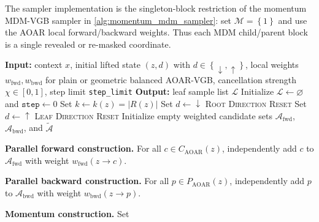 \documentclass{article}
\numberwithin{theorem}{section}
\numberwithin{proposition}{section}
\numberwithin{corollary}{section}
\numberwithin{lemma}{section}
\numberwithin{conjecture}{section}
\numberwithin{remark}{section}
\numberwithin{definition}{section}
\numberwithin{assumption}{section}
\numberwithin{example}{section}
\newcommand{\calM}{{\mathcal{M}}}
\newcommand{\mbra}[1]{\left\{#1\right\}}
\newcommand{\abs}[1]{\left| #1\right|}
\begin{document}
The sampler implementation is the singleton-block restriction of the momentum
MDM-VGB sampler in \cref{alg:momentum_mdm_sampler}: set $\calM=\mbra{1}$ and
use the AOAR local forward/backward weights. Thus each MDM child/parent block
is a single revealed or re-masked coordinate.

\iffalse
\begin{algorithm}[h]
\caption[Momentum AOAR-VGB sampler]{Momentum-balanced AOAR-VGB sampler
(\protect{} = parallelizable area)}
\label{alg:momentum_balanced_aoar_sampler}
\begin{algorithmic}[1]
\Statex \textbf{Input:} context $x$, initial lifted state $(z,d)$ with $d\in\mbra{\downarrow,\uparrow}$, local weights $w_{\mathrm{fwd}},w_{\mathrm{bwd}}$ for plain or geometric balanced AOAR-VGB, cancellation strength $\chi\in[0,1]$, step limit \texttt{step\_limit}
\Statex \textbf{Output:} leaf sample list $\mathcal L$
\State Initialize $\mathcal L\gets\varnothing$ and $\texttt{step}\gets0$
    \State Set $k\gets k(z)=\abs{R(z)}$
        \State Set $d\gets\downarrow$ \hfill \textsc{Root Direction Reset}
    \EndIf
        \State Set $d\gets\uparrow$ \hfill \textsc{Leaf Direction Reset}
    \EndIf
    \State Initialize empty weighted candidate sets $\mathcal A_{\mathrm{fwd}}$, $\mathcal A_{\mathrm{bwd}}$, and $\widetilde{\mathcal A}$
        \Statex \hspace*{\algorithmicindent}\colorbox{Lavender!25}{
        \parbox{0.88\linewidth}{
        \textbf{Parallel forward construction.}
        For all $c\in C_{\mathrm{AOAR}}(z)$, independently add $c$ to
        $\mathcal A_{\mathrm{fwd}}$ with weight $w_{\mathrm{fwd}}(z\to c)$.}}
    \EndIf
        \Statex \hspace*{\algorithmicindent}\colorbox{Lavender!25}{
        \parbox{0.88\linewidth}{
        \textbf{Parallel backward construction.}
        For all $p\in P_{\mathrm{AOAR}}(z)$, independently add $p$ to
        $\mathcal A_{\mathrm{bwd}}$ with weight $w_{\mathrm{bwd}}(z\to p)$.}}
    \EndIf
    \Statex \hspace*{\algorithmicindent}\colorbox{SkyBlue!15}{
    \parbox{0.88\linewidth}{
    \textbf{Momentum construction.}
    Set
    \begin{align*}
    \begin{aligned}

\end{aligned}
\end{align*}}}
\end{algorithmic}
\end{algorithm}
\end{document}
